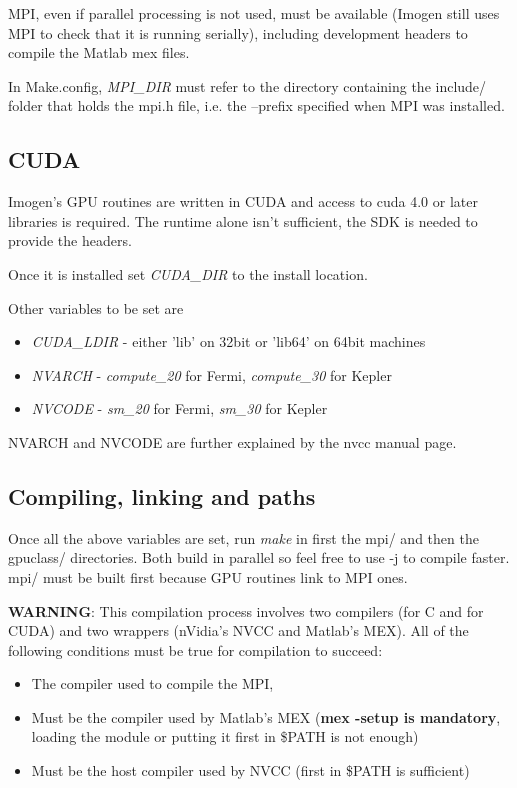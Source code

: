 \documentclass[letterpaper,12pt]{article}
\begin{document}
MPI, even if parallel processing is not used, must be available (Imogen still
uses MPI to check that it is running serially), including development headers
to compile the Matlab mex files.

In Make.config, \textit{MPI\_DIR} must refer to the directory containing the include/ folder
that holds the mpi.h file, i.e. the --prefix specified when MPI was installed.

\subsection{CUDA}

Imogen's GPU routines are written in CUDA and access to cuda 4.0 or later
libraries is required. The runtime alone isn't sufficient, the SDK is
needed to provide the headers.

Once it is installed set \textit{CUDA\_DIR} to the install location.

Other variables to be set are
\begin{itemize}
\item \textit{CUDA\_LDIR} - either 'lib' on 32bit or 'lib64' on 64bit machines
\item \textit{NVARCH} - \textit{compute\_20} for Fermi, \textit{compute\_30} for Kepler
\item \textit{NVCODE} - \textit{sm\_20} for Fermi, \textit{sm\_30} for Kepler
\end{itemize}

NVARCH and NVCODE are further explained by the nvcc manual page.

\subsection{Compiling, linking and paths}

Once all the above variables are set, run \textit{make} in first the mpi/ and then the gpuclass/
directories. Both build in parallel so feel free to use -j to compile faster. mpi/
must be built first because GPU routines link to MPI ones.

\textbf{WARNING}: This compilation process involves two compilers (for C and for CUDA)
and two wrappers (nVidia's NVCC and Matlab's MEX). All of the following conditions
must be true for compilation to succeed:
\begin{itemize}
\item The compiler used to compile the MPI,
\item Must be the compiler used by Matlab's MEX (\textbf{mex -setup is mandatory}, loading the module or putting it first in \$PATH is not enough)
\item Must be the host compiler used by NVCC (first in \$PATH is sufficient)
\end{itemize}
\end{document}
